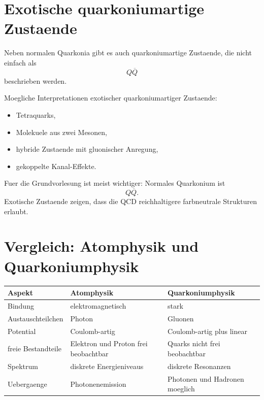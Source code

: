 \section{Exotische quarkoniumartige Zustaende}

Neben normalen Quarkonia gibt es auch quarkoniumartige Zustaende, die nicht einfach
als
\[
    Q\overline{Q}
\]
beschrieben werden.

\begin{conceptbox}
Moegliche Interpretationen exotischer quarkoniumartiger Zustaende:
\begin{itemize}
    \item Tetraquarks,
    \item Molekuele aus zwei Mesonen,
    \item hybride Zustaende mit gluonischer Anregung,
    \item gekoppelte Kanal-Effekte.
\end{itemize}
\end{conceptbox}

\begin{notebox}
Fuer die Grundvorlesung ist meist wichtiger:
Normales Quarkonium ist
\[
    Q\overline{Q}.
\]
Exotische Zustaende zeigen, dass die QCD reichhaltigere farbneutrale Strukturen
erlaubt.
\end{notebox}

\section{Vergleich: Atomphysik und Quarkoniumphysik}

\begin{center}
\begin{tabular}{|p{4.0cm}|p{5.0cm}|p{5.0cm}|}
\hline
Aspekt & Atomphysik & Quarkoniumphysik \\
\hline
Bindung & elektromagnetisch & stark \\
\hline
Austauschteilchen & Photon & Gluonen \\
\hline
Potential & Coulomb-artig & Coulomb-artig plus linear \\
\hline
freie Bestandteile & Elektron und Proton frei beobachtbar & Quarks nicht frei beobachtbar \\
\hline
Spektrum & diskrete Energieniveaus & diskrete Resonanzen \\
\hline
Uebergaenge & Photonenemission & Photonen und Hadronen moeglich \\
\hline
\end{tabular}
\end{center}

